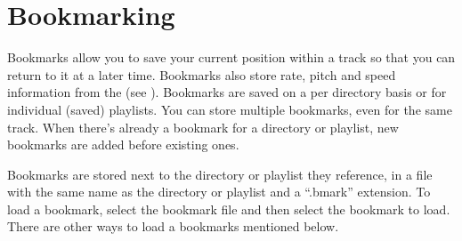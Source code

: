 \section{\label{ref:Bookmarkconfigactual}Bookmarking}
  Bookmarks allow you to save your current position within a track so that 
  you can return to it at a later time. Bookmarks also store rate, pitch
  and speed information from the  (see
  ). Bookmarks are saved on a per directory
  basis or for individual (saved) playlists. You can store multiple bookmarks,
  even for the same track. When there's already a bookmark for a directory or
  playlist, new bookmarks are added before existing ones.

  Bookmarks are stored next to the directory or playlist they reference, in a
  file with the same name as the directory or playlist and a ``.bmark''
  extension. To load a bookmark, select the bookmark file and then select
  the bookmark to load. There are other ways to load a bookmarks mentioned
  below.


